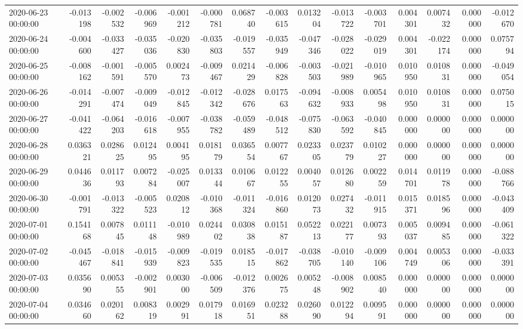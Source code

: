 \begin{tabular}{lrrrrrrrrrrrrrr}
2020-06-23 00:00:00 & -0.013198 & -0.002532 & -0.006969 & -0.001212 & -0.000781 & 0.068740 & -0.003615 & 0.013204 & -0.013722 & -0.003701 & 0.004301 & 0.007432 & 0.000000 & -0.012670 \\
2020-06-24 00:00:00 & -0.004600 & -0.033427 & -0.035036 & -0.020830 & -0.035803 & -0.019557 & -0.035949 & -0.047346 & -0.028022 & -0.029019 & 0.004301 & -0.022174 & 0.000000 & 0.075794 \\
2020-06-25 00:00:00 & -0.008162 & -0.001591 & -0.005570 & 0.002473 & -0.009467 & 0.021429 & -0.006828 & -0.003503 & -0.021989 & -0.010965 & 0.010950 & 0.010831 & 0.000000 & -0.049054 \\
2020-06-26 00:00:00 & -0.014291 & -0.007474 & -0.009049 & -0.012845 & -0.012342 & -0.028676 & 0.017563 & -0.094632 & -0.008933 & 0.005498 & 0.010950 & 0.010831 & 0.000000 & 0.075015 \\
2020-06-27 00:00:00 & -0.041422 & -0.064203 & -0.016618 & -0.007955 & -0.038782 & -0.059489 & -0.048512 & -0.075830 & -0.063592 & -0.040845 & 0.000000 & 0.000000 & 0.000000 & 0.000000 \\
2020-06-28 00:00:00 & 0.036321 & 0.028625 & 0.012495 & 0.004195 & 0.018179 & 0.036554 & 0.007767 & 0.023305 & 0.023779 & 0.010227 & 0.000000 & 0.000000 & 0.000000 & 0.000000 \\
2020-06-29 00:00:00 & 0.044636 & 0.011793 & 0.007284 & -0.025007 & 0.013344 & 0.010667 & 0.012255 & 0.004057 & 0.012680 & 0.002259 & 0.014701 & 0.011978 & 0.000000 & -0.088766 \\
2020-06-30 00:00:00 & -0.001791 & -0.013322 & -0.005523 & 0.020812 & -0.010368 & -0.011324 & -0.016860 & 0.012073 & 0.027432 & -0.011915 & 0.015371 & 0.018596 & 0.000000 & -0.043409 \\
2020-07-01 00:00:00 & 0.154168 & 0.007845 & 0.011148 & -0.010989 & 0.024402 & 0.030838 & 0.015187 & 0.052213 & 0.022177 & 0.007393 & 0.005037 & 0.009485 & 0.000000 & -0.061322 \\
2020-07-02 00:00:00 & -0.045467 & -0.018841 & -0.015939 & -0.009823 & -0.019535 & 0.018515 & -0.017862 & -0.038705 & -0.010140 & -0.009106 & 0.004749 & 0.005306 & 0.000000 & -0.033391 \\
2020-07-03 00:00:00 & 0.035690 & 0.005355 & -0.002901 & 0.003000 & -0.006509 & -0.012376 & 0.002675 & 0.005248 & -0.008902 & 0.008540 & 0.000000 & 0.000000 & 0.000000 & 0.000000 \\
2020-07-04 00:00:00 & 0.034660 & 0.020162 & 0.008319 & 0.002991 & 0.017918 & 0.016951 & 0.023288 & 0.026090 & 0.012294 & 0.009591 & 0.000000 & 0.000000 & 0.000000 & 0.000000 \\

\end{tabular}
